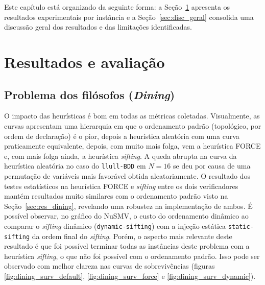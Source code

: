 \documentclass[cic,tc]{infufrgs}
\begin{document}
	Este capítulo está organizado da seguinte forma: a Seção~\ref{sec:resultados_avaliacao2} apresenta os resultados experimentais por instância e a Seção~\ref{sec:disc_geral} consolida uma discussão geral dos resultados e das limitações identificadas.
	
	\section{Resultados e avaliação}
	\label{sec:resultados_avaliacao2}
	
	\subsection{Problema dos filósofos (\textit{Dining})}
	\label{sec:res_dining2}
	O impacto das heurísticas é bom em todas as métricas coletadas.
	Visualmente, as curvas apresentam uma hierarquia em que o ordenamento padrão (topológico, por ordem de declaração) é o pior, depois a heurística aleatória com uma curva praticamente equivalente, depois, com muito mais folga, vem a heurística FORCE e, com mais folga ainda, a heurística \textit{sifting}. 
	A queda abrupta na curva da heurística aleatória no caso do \texttt{llull-BDD} em  $N=16$ se deu por causa de uma permutação de variáveis mais favorável obtida aleatoriamente.
	O resultado dos testes estatísticos na heurística FORCE e \textit{sifting} entre os dois verificadores mantém resultados muito similares com o ordenamento padrão visto na Seção~\ref{sec:res_dining}, revelando uma robustez na implementação de ambos.
	É possível observar, no gráfico do NuSMV, o custo do ordenamento dinâmico ao comparar o \textit{sifting} dinâmico (\texttt{dynamic-sifting}) com a injeção estática \texttt{static-sifting} da ordem final do \textit{sifting}.
	Porém, o aspecto mais relevante deste resultado é que foi possível terminar todas as instâncias deste problema com a heurística \textit{sifting}, o que não foi possível com o ordenamento padrão. 
	Isso pode ser observado com melhor clareza nas curvas de sobrevivências (figuras \ref{fig:dining_surv_default}, \ref{fig:dining_surv_force} e \ref{fig:dining_surv_dynamic}).
	
\end{document}
